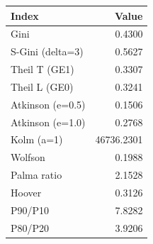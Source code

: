 \begin{tabular}{lr}
\toprule
Index & Value \\
\midrule
Gini & 0.4300 \\
S-Gini (delta=3) & 0.5627 \\
Theil T (GE1) & 0.3307 \\
Theil L (GE0) & 0.3241 \\
Atkinson (e=0.5) & 0.1506 \\
Atkinson (e=1.0) & 0.2768 \\
Kolm (a=1) & 46736.2301 \\
Wolfson & 0.1988 \\
Palma ratio & 2.1528 \\
Hoover & 0.3126 \\
P90/P10 & 7.8282 \\
P80/P20 & 3.9206 \\
\bottomrule
\end{tabular}
